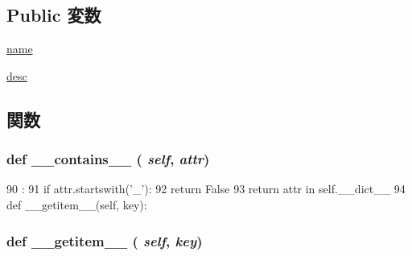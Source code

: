 \subsection*{Public 変数}
\begin{DoxyCompactItemize}
\item 
\hyperlink{classm5_1_1util_1_1jobfile_1_1Data_ab74e6bf80237ddc4109968cedc58c151}{name}
\item 
\hyperlink{classm5_1_1util_1_1jobfile_1_1Data_aafc566bb08a9f46485e7238669581c2b}{desc}
\end{DoxyCompactItemize}


\subsection{関数}
\hypertarget{classm5_1_1util_1_1jobfile_1_1Data_a31ecdf34e79a47aea99a17eea32b7ac2}{
\subsubsection[{\_\-\_\-contains\_\-\_\-}]{\setlength{\rightskip}{0pt plus 5cm}def \_\-\_\-contains\_\-\_\- ( {\em self}, \/   {\em attr})}}
\label{classm5_1_1util_1_1jobfile_1_1Data_a31ecdf34e79a47aea99a17eea32b7ac2}



\begin{DoxyCode}
90                                 :
91         if attr.startswith('_'):
92             return False
93         return attr in self.__dict__
94 
    def __getitem__(self, key):
\end{DoxyCode}
\hypertarget{classm5_1_1util_1_1jobfile_1_1Data_a50d766f4276c3d8fe330ac8cd344a75f}{
\subsubsection[{\_\-\_\-getitem\_\-\_\-}]{\setlength{\rightskip}{0pt plus 5cm}def \_\-\_\-getitem\_\-\_\- ( {\em self}, \/   {\em key})}}
\label{classm5_1_1util_1_1jobfile_1_1Data_a50d766f4276c3d8fe330ac8cd344a75f}



